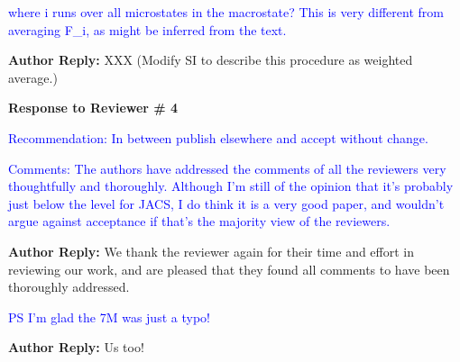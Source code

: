 \documentclass[11pt,a4paper]{letter} %
\begin{document}
\textcolor{blue}{
where i runs over all microstates in the macrostate? This is very different from averaging F\_i, as might be inferred from the text.
}

\textbf{Author Reply:} XXX (Modify SI to describe this procedure as weighted average.)






\begin{shaded}
\textbf{Response to Reviewer \# 4}
\end{shaded}

\textcolor{blue}{Recommendation: In between publish elsewhere and accept without change.
}

\textcolor{blue}{Comments:
The authors have addressed the comments of all the reviewers very thoughtfully and thoroughly. Although I'm still of the opinion that it's probably just below the level for JACS, I do think it is a very good paper, and wouldn't argue against acceptance if that's the majority view of the reviewers.
}

\textbf{Author Reply:} We thank the reviewer again for their time and effort in reviewing our work, and are pleased that they found all comments to have been thoroughly addressed.

\textcolor{blue}{
PS I'm glad the 7M was just a typo!
}

\textbf{Author Reply:} Us too!




\clearpage
\newpage



\end{document}
